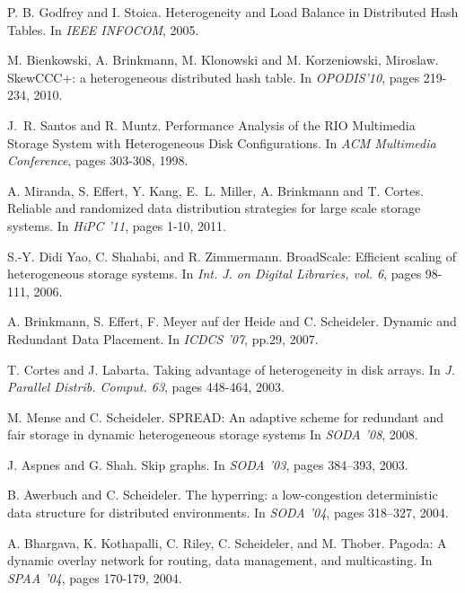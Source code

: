 \documentclass[11pt]{article}
\begin{document}
\begin{thebibliography}{10}
P. B. Godfrey and I. Stoica.
\newblock Heterogeneity and Load Balance in Distributed Hash Tables.
\newblock In {\em IEEE INFOCOM},  2005.

M. Bienkowski, A. Brinkmann, M. Klonowski and M. Korzeniowski, Miroslaw.
\newblock SkewCCC+: a heterogeneous distributed hash table.
\newblock In {\em OPODIS'10}, pages 219-234, 2010.



J.~R. Santos and R. Muntz.
\newblock Performance Analysis of the RIO Multimedia Storage System with Heterogeneous Disk Configurations.
\newblock In {\em ACM Multimedia Conference}, pages 303-308, 1998.

A. Miranda, S. Effert, Y. Kang, E.~L. Miller, A. Brinkmann and T. Cortes.
\newblock Reliable and randomized data distribution strategies for large scale storage systems.
\newblock In {\em HiPC '11}, pages 1-10, 2011.

S.-Y. Didi Yao, C. Shahabi, and R. Zimmermann.
\newblock BroadScale: Efficient scaling of heterogeneous storage systems.
\newblock In {\em Int. J. on Digital Libraries, vol. 6}, pages 98-111, 2006.


A. Brinkmann, S. Effert, F. Meyer auf der Heide and C. Scheideler.
\newblock Dynamic and Redundant Data Placement.
\newblock In {\em ICDCS '07}, pp.29, 2007.

T. Cortes and J. Labarta.
\newblock Taking advantage of heterogeneity in disk arrays.
\newblock In {\em J. Parallel Distrib. Comput. 63}, pages 448-464, 2003.

M. Mense and C. Scheideler.
\newblock SPREAD: An adaptive scheme for redundant and fair storage in dynamic heterogeneous storage systems
\newblock In {\em SODA '08}, 2008.

J. Aspnes and G. Shah.
\newblock Skip graphs.
\newblock In {\em SODA '03}, pages 384--393, 2003.

B. Awerbuch and C. Scheideler.
\newblock The hyperring: a low-congestion deterministic data structure for
  distributed environments.
\newblock In {\em SODA '04}, pages 318--327, 2004.

A. Bhargava, K. Kothapalli, C. Riley, C. Scheideler, and M.
  Thober.
\newblock Pagoda: A dynamic overlay network for routing, data management, and
  multicasting.
\newblock In {\em SPAA '04}, pages 170-179, 2004.


\end{thebibliography}
\end{document}
